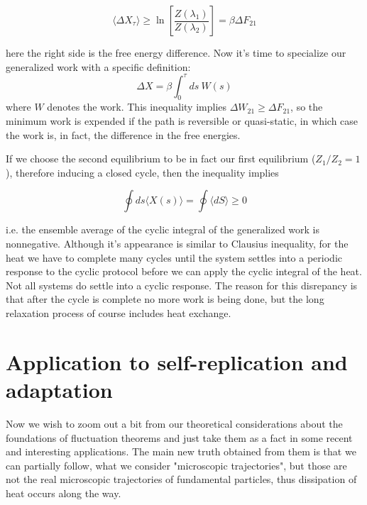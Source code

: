 \documentclass[a4paper,12pt]{article}
\begin{document}
\begin{equation}
  \langle \Delta X_\tau \rangle \geq \ln\left[\frac{Z(\lambda_1)}{Z(\lambda_2)}\right]=\beta \Delta F_{21}
\end{equation}

here the right side is the free energy difference. Now it's time to specialize our generalized work with a specific definition:
\begin{equation}
  \Delta X = \beta \int_0^\tau ds\ W(s)
\end{equation}
where $W$ denotes the work. This inequality implies $\Delta W_{21} \geq \Delta F_{21} $, so the minimum work is expended if the path is reversible or quasi-static, in which case the work is, in fact, the difference in the free energies.%

If we choose the second equilibrium to be in fact our first equilibrium ($Z_1/Z_2=1$), therefore inducing a closed cycle, then the inequality implies

\begin{equation}
\label{CyclicInequalityForGeneralizedWork}
  \oint ds \langle X(s) \rangle = \oint \langle dS \rangle \geq 0
\end{equation}

i.e. the ensemble average of the cyclic integral of the generalized work is nonnegative.
Although it's appearance is similar to Clausius inequality, for the heat we have to complete many cycles until the system settles into a periodic response to the cyclic protocol before we can apply the cyclic integral of the heat. Not all systems do settle into a cyclic response. The reason for this disrepancy is that after the cycle is complete no more work is being done, but the long relaxation process of course includes heat exchange. 

\section{Application to self-replication and adaptation}
\label{CrooksApplications}
Now we wish to zoom out a bit from our theoretical considerations about the foundations of fluctuation theorems and just take them as a fact in some recent and interesting applications\cite{Perunov:2016hl}\cite{England:2013ed}. The main new truth obtained from them is that we can partially follow, what we consider "microscopic trajectories", but those are not the real microscopic trajectories of fundamental particles, thus dissipation of heat occurs along the way.
\end{document}
